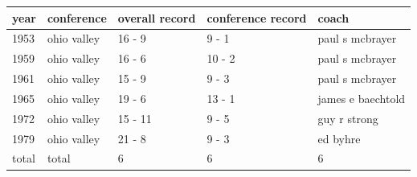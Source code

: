 \documentclass{article}
\begin{document}
\begin{tabular}{lllll}
\toprule
year & conference & overall record & conference record & coach \\
\midrule
1953 & ohio valley & 16 - 9 & 9 - 1 & paul s mcbrayer \\
1959 & ohio valley & 16 - 6 & 10 - 2 & paul s mcbrayer \\
1961 & ohio valley & 15 - 9 & 9 - 3 & paul s mcbrayer \\
1965 & ohio valley & 19 - 6 & 13 - 1 & james e baechtold \\
1972 & ohio valley & 15 - 11 & 9 - 5 & guy r strong \\
1979 & ohio valley & 21 - 8 & 9 - 3 & ed byhre \\
total & total & 6 & 6 & 6 \\
\bottomrule
\end{tabular}
\end{document}
